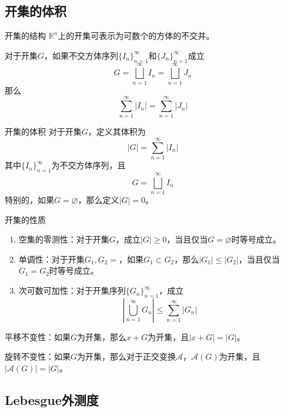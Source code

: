 \documentclass[lang = cn, scheme = chinese, thmcnt = section]{elegantbook}
\newcommand{\R}{\mathbb{R}}            %
\newcommand{\sub}{\subset}             %
\begin{document}
\subsection{开集的体积}

\begin{lemma}{开集的结构}
	$\R^n$上的开集可表示为可数个的方体的不交并。
\end{lemma}

\begin{lemma}
	对于开集$G$，如果不交方体序列$\{ I_n \}_{n=1}^{\infty}$和$\{ J_n \}_{n=1}^{\infty}$成立
	$$
	G=\bigsqcup_{n=1}^{\infty}{I_n}=\bigsqcup_{n=1}^{\infty}{J_n}
	$$
	那么
	$$
	\sum_{n=1}^{\infty}{|I_n|}=\sum_{n=1}^{\infty}{|J_n|}
	$$
\end{lemma}

\begin{definition}{开集的体积}
	对于开集$G$，定义其体积为
	$$
	|G|=\sum_{n=1}^{\infty}{|I_n|}
	$$
	其中$\{ I_n \}_{n=1}^{\infty}$为不交方体序列，且
	$$
	G=\bigsqcup_{n=1}^{\infty}{I_n}
	$$
	特别的，如果$G=\varnothing$，那么定义$|G|=0$。
\end{definition}

\begin{theorem}{开集的性质}
	\begin{enumerate}
		\item 空集的零测性：对于开集$G$，成立$|G|\ge 0$，当且仅当$G=\varnothing$时等号成立。
		\item 单调性：对于开集$G_1,G_2=$，如果$G_1\sub G_2$，那么$|G_1|\le |G_2|$，当且仅当$G_1=G_2$时等号成立。
		\item 次可数可加性：对于开集序列$\{ G_n \}_{n=1}^{\infty}$，成立
		$$
		\left| \bigcup_{n=1}^{\infty}{G_n} \right|\le\sum_{n=1}^{\infty}{|G_n|}
		$$
	\end{enumerate}
\end{theorem}

\begin{exercise}
	平移不变性：如果$G$为开集，那么$x+G$为开集，且$|x+G|=|G|$。
\end{exercise}

\begin{exercise}
	旋转不变性：如果$G$为开集，那么对于正交变换$\mathscr{A}$，$\mathscr{A}(G)$为开集，且$|\mathscr{A}(G)|=|G|$。
\end{exercise}

\subsection{Lebesgue外测度}
\end{document}
